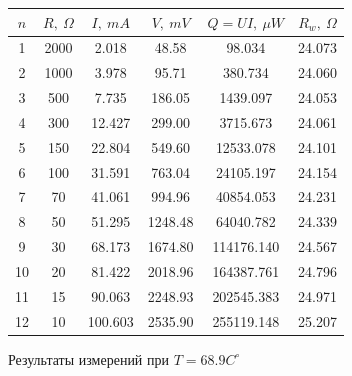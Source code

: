 \documentclass[a4paper,12pt]{report}
\begin{document}
    \begin{figure}[H]
        \centering
        \begin{tabular}{|c|c|c|c|c|c|}
            \hline
            $n$ & $R,\ \Omega$ & $I, \ mA$ & $V,\ mV$ & $Q=UI,\ \mu W$ & $R_{w}, \ \Omega$ \\
            \hline
            1 & 2000 & 2.018 & 48.58 & 98.034 & 24.073 \\
            \hline
            2 & 1000 & 3.978 & 95.71 & 380.734 & 24.060 \\
            \hline
            3 & 500 & 7.735 & 186.05 & 1439.097 & 24.053 \\
            \hline
            4 & 300 & 12.427 & 299.00 & 3715.673 & 24.061 \\
            \hline
            5 & 150 & 22.804 & 549.60 & 12533.078 & 24.101 \\
            \hline
            6 & 100 & 31.591 & 763.04 & 24105.197 & 24.154 \\
            \hline
            7 & 70 & 41.061 & 994.96 & 40854.053 & 24.231 \\
            \hline
            8 & 50 & 51.295 & 1248.48 & 64040.782 & 24.339 \\
            \hline
            9 & 30 & 68.173 & 1674.80 & 114176.140 & 24.567 \\
            \hline
            10 & 20 & 81.422 & 2018.96 & 164387.761 & 24.796 \\
            \hline
            11 & 15 & 90.063 & 2248.93 & 202545.383 & 24.971 \\
            \hline
            12 & 10 & 100.603 & 2535.90 & 255119.148 & 25.207 \\
            \hline
        \end{tabular}
        \caption{Результаты измерений при $T=68.9C^\circ$}
    \end{figure}
\end{document}
